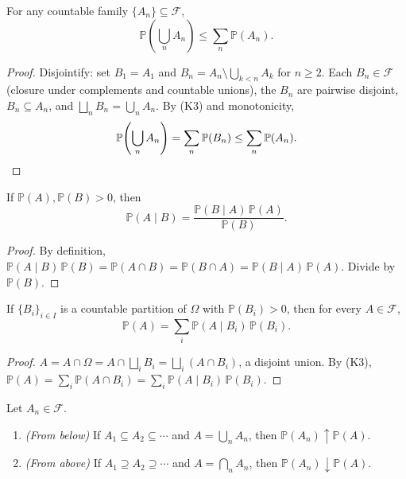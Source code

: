 \begin{theorem}
For any countable family $\{A_{n}\} \subseteq \mathcal{F}$,
\[
  \mathbb{P}\!\left(\bigcup_{n} A_{n}\right) \leq \sum_{n} \mathbb{P}(A_{n}).
\]
\end{theorem}

\begin{proof}
Disjointify: set $B_{1} = A_{1}$ and $B_{n} = A_{n} \setminus \bigcup_{k < n} A_{k}$ for $n \geq 2$. Each $B_{n} \in \mathcal{F}$ (closure under complements and countable unions), the $B_{n}$ are pairwise disjoint, $B_{n} \subseteq A_{n}$, and $\bigsqcup_{n} B_{n} = \bigcup_{n} A_{n}$. By (K3) and monotonicity,
\[
  \mathbb{P}\!\left(\bigcup_{n} A_{n}\right) = \sum_{n} \mathbb{P}(B_{n}) \leq \sum_{n} \mathbb{P}(A_{n}). \qedhere
\]
\end{proof}

\begin{theorem}[Bayes]
If $\mathbb{P}(A), \mathbb{P}(B) > 0$, then
\[
  \mathbb{P}(A \mid B) = \frac{\mathbb{P}(B \mid A)\,\mathbb{P}(A)}{\mathbb{P}(B)}.
\]
\end{theorem}

\begin{proof}
By definition, $\mathbb{P}(A \mid B)\,\mathbb{P}(B) = \mathbb{P}(A \cap B) = \mathbb{P}(B \cap A) = \mathbb{P}(B \mid A)\,\mathbb{P}(A)$. Divide by $\mathbb{P}(B)$.
\end{proof}

\begin{theorem}
If $\{B_{i}\}_{i \in I}$ is a countable partition of $\Omega$ with $\mathbb{P}(B_{i}) > 0$, then for every $A \in \mathcal{F}$,
\[
  \mathbb{P}(A) = \sum_{i} \mathbb{P}(A \mid B_{i})\,\mathbb{P}(B_{i}).
\]
\end{theorem}

\begin{proof}
$A = A \cap \Omega = A \cap \bigsqcup_{i} B_{i} = \bigsqcup_{i} (A \cap B_{i})$, a disjoint union. By (K3), $\mathbb{P}(A) = \sum_{i} \mathbb{P}(A \cap B_{i}) = \sum_{i} \mathbb{P}(A \mid B_{i})\,\mathbb{P}(B_{i})$.
\end{proof}

\begin{theorem}
Let $A_{n} \in \mathcal{F}$.
\begin{enumerate}
  \item \emph{(From below)} If $A_{1} \subseteq A_{2} \subseteq \cdots$ and $A = \bigcup_{n} A_{n}$, then $\mathbb{P}(A_{n}) \uparrow \mathbb{P}(A)$.
  \item \emph{(From above)} If $A_{1} \supseteq A_{2} \supseteq \cdots$ and $A = \bigcap_{n} A_{n}$, then $\mathbb{P}(A_{n}) \downarrow \mathbb{P}(A)$.
\end{enumerate}
\end{theorem}

